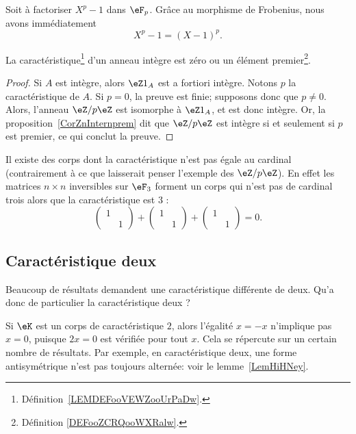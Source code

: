 \begin{example}
	Soit à factoriser \( X^p-1\) dans \( \eF_p\). Grâce au morphisme de Frobenius, nous avons immédiatement
	\begin{equation}
		X^p-1=(X-1)^p.
	\end{equation}
\end{example}


\begin{lemma}       \label{LemCaractIntergernbrcartpre}
	La caractéristique\footnote{Définition~\ref{LEMDEFooVEWZooUrPaDw}.} d'un anneau intègre est zéro ou un élément premier\footnote{Définition \ref{DEFooZCRQooWXRalw}.}.
\end{lemma}

\begin{proof}
	Si \( A\) est intègre, alors \( \eZ 1_A\) est a fortiori intègre. Notons \( p \) la caractéristique de \( A \). Si \( p = 0 \), la preuve est finie; supposons donc que \( p \neq 0 \). Alors, l'anneau \( \eZ/p\eZ\) est isomorphe à \( \eZ 1_A\), et est donc intègre. Or, la proposition~\ref{CorZnInternprem} dit que \( \eZ/p\eZ\) est intègre si et seulement si \( p\) est premier, ce qui conclut la preuve.
\end{proof}

\begin{example}
	Il existe des corps dont la caractéristique n'est pas égale au cardinal (contrairement à ce que laisserait penser l'exemple des \( \eZ/p\eZ\)). En effet les matrices \( n\times n\) inversibles sur \( \eF_{3}\) forment un corps qui n'est pas de cardinal trois alors que la caractéristique est \( 3\) :
	\begin{equation}
		\begin{pmatrix}
			1 &   \\
			  & 1
		\end{pmatrix}+\begin{pmatrix}
			1 &   \\
			  & 1
		\end{pmatrix}+\begin{pmatrix}
			1 &   \\
			  & 1
		\end{pmatrix}=0.
	\end{equation}
\end{example}


\subsection{Caractéristique deux}

Beaucoup de résultats demandent une caractéristique différente de deux. Qu'a donc de particulier la caractéristique deux ?

Si \( \eK\) est un corps de caractéristique \( 2\), alors l'égalité \( x=-x\) n'implique pas \( x=0\), puisque \( 2x=0\) est vérifiée pour tout \( x\). Cela se répercute sur un certain nombre de résultats. Par exemple, en caractéristique deux, une forme antisymétrique n'est pas toujours alternée: voir le lemme~\ref{LemHiHNey}.
